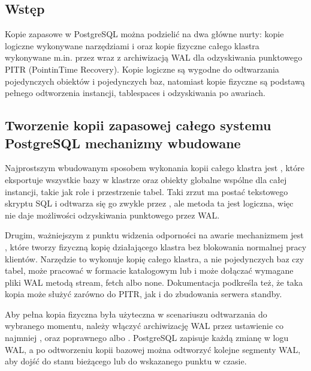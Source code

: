 \documentclass[letterpaper,10pt,polish]{sphinxmanual}
\begin{document}
\subsection{Wstęp}
\label{\detokenize{rozdzia_u0142_2/rozdzia_u0142_28/index:wstep}}
\sphinxAtStartPar
Kopie zapasowe w PostgreSQL można podzielić na dwa główne nurty: kopie logiczne wykonywane narzędziami  i   oraz kopie fizyczne całego klastra wykonywane m.in. przez  wraz z archiwizacją WAL dla odzyskiwania punktowego PITR (Point\sphinxhyphen{}in\sphinxhyphen{}Time Recovery). Kopie logiczne są wygodne do odtwarzania pojedynczych obiektów i pojedynczych baz, natomiast kopie fizyczne są podstawą pełnego odtworzenia instancji, tablespaces i odzyskiwania po awariach.


\subsection{Tworzenie kopii zapasowej całego systemu PostgreSQL \sphinxhyphen{} mechanizmy wbudowane}
\label{\detokenize{rozdzia_u0142_2/rozdzia_u0142_28/index:tworzenie-kopii-zapasowej-calego-systemu-postgresql-mechanizmy-wbudowane}}
\sphinxAtStartPar
Najprostszym wbudowanym sposobem wykonania kopii całego klastra jest , które eksportuje wszystkie bazy w klastrze oraz obiekty globalne wspólne dla całej instancji, takie jak role i przestrzenie tabel. Taki zrzut ma postać tekstowego skryptu SQL i odtwarza się go zwykle przez , ale metoda ta jest logiczna, więc nie daje możliwości odzyskiwania punktowego przez WAL.

\sphinxAtStartPar
Drugim, ważniejszym z punktu widzenia odporności na awarie mechanizmem jest , które tworzy fizyczną kopię działającego klastra bez blokowania normalnej pracy klientów. Narzędzie to wykonuje kopię całego klastra, a nie pojedynczych baz czy tabel, może pracować w formacie katalogowym lub  i może dołączać wymagane pliki WAL metodą stream, fetch albo none. Dokumentacja podkreśla też, że taka kopia może służyć zarówno do PITR, jak i do zbudowania serwera standby.

\sphinxAtStartPar
Aby pełna kopia fizyczna była użyteczna w scenariuszu odtwarzania do wybranego momentu, należy włączyć archiwizację WAL przez ustawienie co najmniej ,  oraz poprawnego  albo . PostgreSQL zapisuje każdą zmianę w logu WAL, a po odtworzeniu kopii bazowej można odtworzyć kolejne segmenty WAL, aby dojść do stanu bieżącego lub do wskazanego punktu w czasie.
\end{document}
